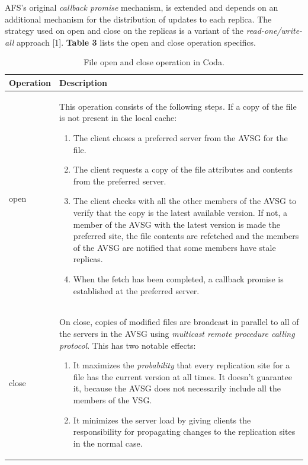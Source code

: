 AFS's original \emph{callback promise} mechanism, is extended and depends on an additional mechanism for the distribution of updates to each replica. The strategy used on open and close on the replicas is a variant of the \emph{read-one/write-all} approach [1]. \textbf{Table 3} lists the open and close operation specifics.


\begin{table}
	\caption{File open and close operation in Coda.}
	\label{tab:api:coda}
	\begin{tabular}{p{150px} | p{250px}}
		\textbf{Operation} & \textbf{Description} \\
		\hline
		open 	& This operation consists of the following steps. If a copy of the file is not present in the local cache:
				\begin{enumerate}
					\item The client choses a preferred server from the AVSG for the file.
					\item The client requests a copy of the file attributes and contents from the preferred server.
					\item The client checks with all the other members of the AVSG to verify that the copy is the latest available version. If not, a member of the AVSG with the latest version is made the preferred site, the file contents are refetched and the members of the AVSG are notified that some members have stale replicas.
					\item When the fetch has been completed, a callback promise is established at the preferred server.
				\end{enumerate} \\
		close & On close, copies of modified files are broadcast in parallel to all of the servers in the AVSG using \emph{multicast remote procedure calling protocol}. This has two notable effects:
				\begin{enumerate}
					\item It maximizes the \textit{probability} that every replication site for a file has the current version at all times. It doesn't guarantee it, because the AVSG does not necessarily include all the members of the VSG.
					\item It minimizes the server load by giving clients the responsibility for propagating changes to the replication sites in the normal case.
				\end{enumerate} \\
		\hline
	\end{tabular}
\end{table}




